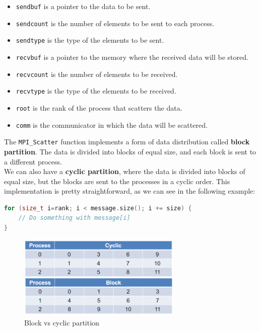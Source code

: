 \begin{itemize}
    \item \texttt{sendbuf} is a pointer to the data to be sent.
    \item \texttt{sendcount} is the number of elements to be sent to each process.
    \item \texttt{sendtype} is the type of the elements to be sent.
    \item \texttt{recvbuf} is a pointer to the memory where the received data will be stored.
    \item \texttt{recvcount} is the number of elements to be received.
    \item \texttt{recvtype} is the type of the elements to be received.
    \item \texttt{root} is the rank of the process that scatters the data.
    \item \texttt{comm} is the communicator in which the data will be scattered.
\end{itemize}

The \texttt{MPI\_Scatter} function implements a form of data distribution called
\textbf{block partition}. The data is divided into blocks of equal size, and each block is
sent to a different process.\\

We can also have a \textbf{cyclic partition}, where the data is divided into blocks of equal
size, but the blocks are sent to the processes in a cyclic order. This implementation is
pretty straightforward, as we can see in the following example:

\begin{lstlisting}[language=C++]
for (size_t i=rank; i < message.size(); i += size) {
    // Do something with message[i]
}
\end{lstlisting}

\begin{figure}[H]
    \centering
    \includegraphics[width=0.7\textwidth]{figures/block_vs_cyclic.png}
    \caption{Block vs cyclic partition}
    \label{fig:block_vs_cyclic}
\end{figure}

